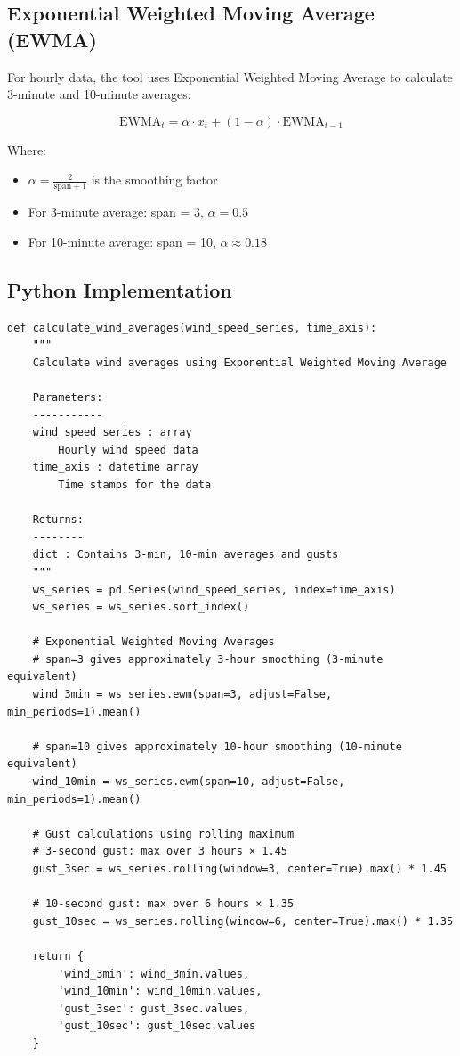 \documentclass[12pt]{article}
\begin{document}
\subsection{Exponential Weighted Moving Average (EWMA)}

For hourly data, the tool uses Exponential Weighted Moving Average to calculate 3-minute and 10-minute averages:

\begin{equation}
\text{EWMA}_t = \alpha \cdot x_t + (1 - \alpha) \cdot \text{EWMA}_{t-1}
\end{equation}

Where:
\begin{itemize}
    \item $\alpha = \frac{2}{\text{span} + 1}$ is the smoothing factor
    \item For 3-minute average: span = 3, $\alpha = 0.5$
    \item For 10-minute average: span = 10, $\alpha \approx 0.18$
\end{itemize}

\subsection{Python Implementation}

\begin{lstlisting}[caption=Wind Averaging Calculation]
def calculate_wind_averages(wind_speed_series, time_axis):
    """
    Calculate wind averages using Exponential Weighted Moving Average
    
    Parameters:
    -----------
    wind_speed_series : array
        Hourly wind speed data
    time_axis : datetime array
        Time stamps for the data
    
    Returns:
    --------
    dict : Contains 3-min, 10-min averages and gusts
    """
    ws_series = pd.Series(wind_speed_series, index=time_axis)
    ws_series = ws_series.sort_index()
    
    # Exponential Weighted Moving Averages
    # span=3 gives approximately 3-hour smoothing (3-minute equivalent)
    wind_3min = ws_series.ewm(span=3, adjust=False, min_periods=1).mean()
    
    # span=10 gives approximately 10-hour smoothing (10-minute equivalent)
    wind_10min = ws_series.ewm(span=10, adjust=False, min_periods=1).mean()
    
    # Gust calculations using rolling maximum
    # 3-second gust: max over 3 hours × 1.45
    gust_3sec = ws_series.rolling(window=3, center=True).max() * 1.45
    
    # 10-second gust: max over 6 hours × 1.35
    gust_10sec = ws_series.rolling(window=6, center=True).max() * 1.35
    
    return {
        'wind_3min': wind_3min.values,
        'wind_10min': wind_10min.values,
        'gust_3sec': gust_3sec.values,
        'gust_10sec': gust_10sec.values
    }
\end{lstlisting}
\end{document}
